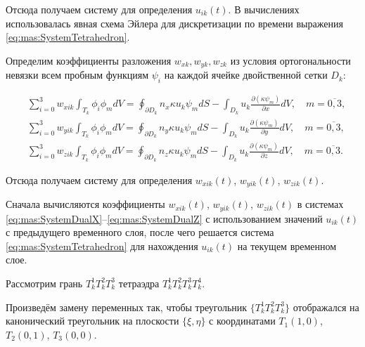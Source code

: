 Отсюда получаем систему для определения $u_{ik}( t )$. В вычислениях использовалась явная схема Эйлера для дискретизации по времени выражения \eqref{eq:mas:SystemTetrahedron}.



Определим коэффициенты разложения $w_{xk}, w_{yk}, w_{zk}$ из условия ортогональности невязки всем пробным функциям $\psi_i$ на каждой ячейке двойственной сетки $D_k$:

\begin{align}

&\sum_{i=0}^3 w_{xik} \int _{T_k} \phi_i\phi_m dV= \oint _{\partial D_k} n_x \kappa u_k \psi_m dS -\int _{D_k} u_k \frac{\partial \left(\kappa \psi_m\right)}{\partial x} dV, \quad m = \overline{0, 3}, \label{eq:mas:SystemDualX}\\

&\sum_{i=0}^3 w_{yik} \int _{T_k} \phi_i\phi_m dV= \oint _{\partial D_k} n_y \kappa u_k \psi_m dS -\int _{D_k} u_k \frac{\partial \left(\kappa \psi_m\right)}{\partial y} dV, \quad m = \overline{0, 3}, \label{eq:mas:SystemDualZ}\\

&\sum_{i=0}^3 w_{zik} \int _{T_k} \phi_i\phi_m dV= \oint _{\partial D_k} n_z \kappa u_k \psi_m dS -\int _{D_k} u_k \frac{\partial \left(\kappa \psi_m\right)}{\partial z} dV, \quad m = \overline{0, 3}. \label{eq:mas:SystemDualZ}

\end{align}

Отсюда получаем систему для определения $w_{xik}( t )$, $w_{yik}( t )$, $w_{zik}( t )$.



Сначала вычисляются коэффициенты $w_{xik}( t )$, $w_{yik}( t )$, $w_{zik}( t )$ в системах \eqref{eq:mas:SystemDualX}--\eqref{eq:mas:SystemDualZ} с использованием значений $u_{ik}( t )$ с предыдущего временного слоя, после чего решается система \eqref{eq:mas:SystemTetrahedron} для нахождения $u_{ik}( t )$ на текущем временном слое. 



\smallskip




Рассмотрим грань $T^1_kT^2_kT^3_k$ тетраэдра $T^1_kT^2_kT^3_kT^4_k$.

Произведём замену переменных так, чтобы треугольник $\{T^1_kT^2_kT^3_k\}$ отображался на канонический треугольник на плоскости $\{\xi,\eta\}$ с координатами $T_1\left(1, 0\right)$, $T_2\left(0, 1\right)$, $T_3\left(0, 0\right)$.

